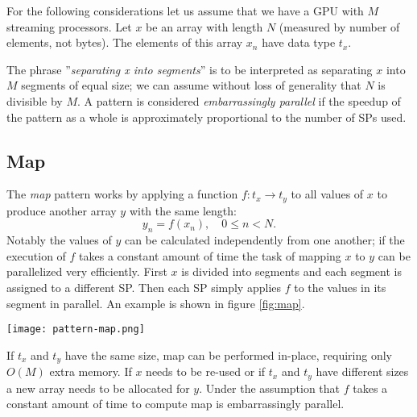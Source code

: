 For the following considerations let us assume that we have a GPU with $M$ streaming processors.
Let $x$ be an array with length $N$ (measured by number of elements, not bytes).
The elements of this array $x_n$ have data type $t_x$.

The phrase ''\textit{separating x into segments}'' is to be interpreted as separating $x$ into $M$ segments of equal size;
we can assume without loss of generality that $N$ is divisible by $M$.
A pattern is considered \textit{embarrassingly parallel} if the speedup of the pattern as a whole
is approximately proportional to the number of SPs used.
\subsection{Map}
\label{map}
The \textit{map} pattern works by applying a function $f: t_x \rightarrow t_y$
to all values of $x$ to produce another array $y$ with the same length:
\begin{equation}
	y_n = f(x_n), \quad 0 \le n < N.
\end{equation}
Notably the values of $y$ can be calculated independently from one another;
if the execution of $f$ takes a constant amount of time the task of mapping $x$ to $y$ can be parallelized very efficiently.
First $x$ is divided into segments and each segment is assigned to a different SP.
Then each SP simply applies $f$ to the values in its segment in parallel.
An example is shown in figure \ref{fig:map}.
\begin{figure*}
	\centering
	\texttt{[image: pattern-map.png]}
	\caption{
		Visualization of the map pattern.
		3-vectors are mapped to their lengths.
		Because the two data types have different sizes the operation is not performed in-place.
	}
	\label{fig:map}
\end{figure*}
If $t_x$ and $t_y$ have the same size, map can be performed in-place, requiring only $O(M)$ extra memory.
If $x$ needs to be re-used or if $t_x$ and $t_y$ have different sizes a new array needs to be allocated for $y$.
Under the assumption that $f$ takes a constant amount of time to compute map is embarrassingly parallel.
